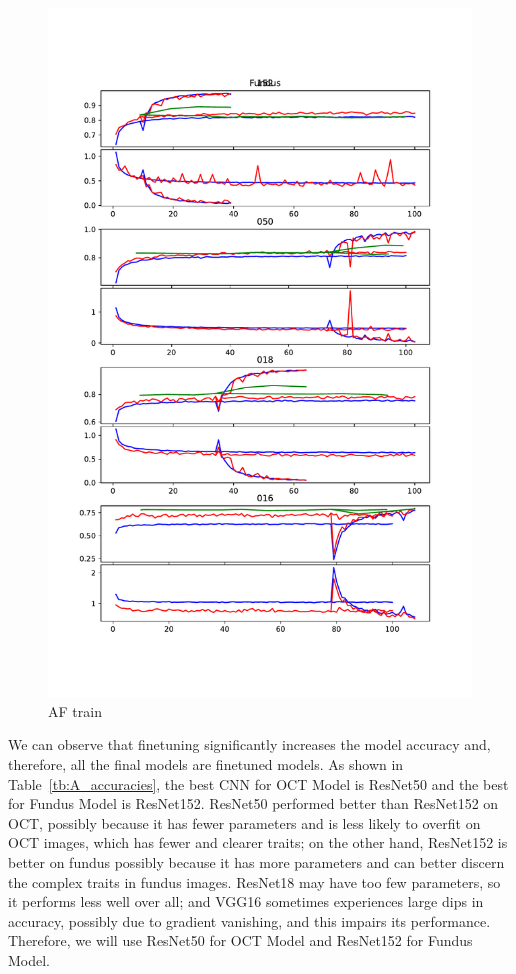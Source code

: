 \documentclass{article}
\begin{document}
	\begin{figure}[htbp]
		\centering
		\includegraphics[width=\linewidth]{Figs/abnormity_Fundus_loss_and_acc.pdf}
		\caption{AF train}
		\vspace{0.3cm}
		\label{fig:AF_train}
	\end{figure}
	
	We can observe that finetuning significantly increases the model accuracy and, therefore, all the final models are finetuned models. As shown in Table~\ref{tb:A_accuracies}, the best CNN for OCT Model is ResNet50 and the best for Fundus Model is ResNet152. ResNet50 performed better than ResNet152 on OCT, possibly because it has fewer parameters and is less likely to overfit on OCT images, which has fewer and clearer traits; on the other hand, ResNet152 is better on fundus possibly because it has more parameters and can better discern the complex traits in fundus images. ResNet18 may have too few parameters, so it performs less well over all; and VGG16 sometimes experiences large dips in accuracy, possibly due to gradient vanishing, and this impairs its performance. Therefore, we will use ResNet50 for OCT Model and ResNet152 for Fundus Model. 
	
\end{document}
